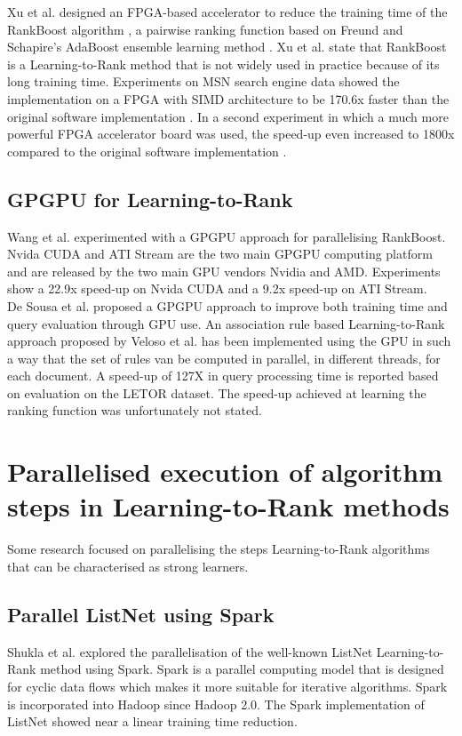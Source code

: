 Xu et al. \cite{Xu2007b,Xu2009} designed an \ac{FPGA}-based accelerator to reduce the training time of the RankBoost algorithm \cite{Freund2003}, a pairwise ranking function based on Freund and Schapire's AdaBoost ensemble learning method \cite{Freund1997}. Xu et al. \cite{Xu2009} state that RankBoost is a Learning-to-Rank method that is not widely used in practice because of its long training time. Experiments on MSN search engine data showed the implementation on a \ac{FPGA} with \ac{SIMD} architecture to be 170.6x faster than the original software implementation \cite{Xu2007b}. In a second experiment in which a much more powerful \ac{FPGA} accelerator board was used, the speed-up even increased to 1800x compared to the original software implementation \cite{Xu2009}.\\

\subsection{GPGPU for Learning-to-Rank}
Wang et al. \cite{Wang2009} experimented with a \ac{GPGPU} approach for parallelising RankBoost. Nvida \ac{CUDA} and ATI Stream are the two main \ac{GPGPU} computing platform and are released by the two main \ac{GPU} vendors Nvidia and AMD. Experiments show a 22.9x speed-up on Nvida \ac{CUDA} and a 9.2x speed-up on ATI Stream.\\

De Sousa et al. \cite{DeSousa2012} proposed a \ac{GPGPU} approach to improve both training time and query evaluation through \ac{GPU} use. An association rule based Learning-to-Rank approach proposed by Veloso et al. \cite{Veloso2008} has been implemented using the \ac{GPU} in such a way that the set of rules van be computed in parallel, in different threads, for each document. A speed-up of 127X in query processing time is reported based on evaluation on the LETOR dataset. The speed-up achieved at learning the ranking function was unfortunately not stated.\\

\section{Parallelised execution of algorithm steps in Learning-to-Rank methods}
Some research focused on parallelising the steps Learning-to-Rank algorithms that can be characterised as strong learners.
\subsection{Parallel ListNet using Spark}
Shukla et al. \cite{Shukla2012} explored the parallelisation of the well-known ListNet Learning-to-Rank method using Spark. Spark is a parallel computing model that is designed for cyclic data flows which makes it more suitable for iterative algorithms. Spark is incorporated into Hadoop since Hadoop 2.0. The Spark implementation of ListNet showed near a linear training time reduction.\\

